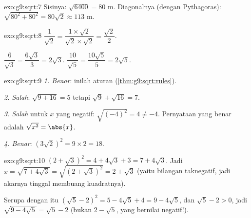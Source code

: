 \begin{solution}{exo:g9:sqrt:7}
Sisinya: $\sqrt{6400} = 80$ m. Diagonalnya (dengan Pythagoras):
$\sqrt{80^2 + 80^2} = 80\sqrt2 \approx 113$ m.
\end{solution}

\begin{solution}{exo:g9:sqrt:8}
$\dfrac{1}{\sqrt2} = \dfrac{1 \times \sqrt2}{\sqrt2 \times \sqrt2}
= \dfrac{\sqrt2}{2}$.

$\dfrac{6}{\sqrt3} = \dfrac{6\sqrt3}{3} = 2\sqrt3$.
\quad
$\dfrac{10}{\sqrt5} = \dfrac{10\sqrt5}{5} = 2\sqrt5$.
\end{solution}

\begin{solution}{exo:g9:sqrt:9}
\emph{1. Benar}: inilah aturan  (\cref{thm:g9:sqrt:rules}).

\emph{2. Salah}: $\sqrt{9 + 16} = 5$ tetapi $\sqrt9 + \sqrt{16} = 7$.

\emph{3. Salah} untuk $x$ yang negatif: $\sqrt{(-4)^2} = 4 \neq -4$.
Pernyataan yang benar adalah $\sqrt{x^2} = \abs{x}$.

\emph{4. Benar}: $\left(3\sqrt2\right)^2 = 9 \times 2 = 18$.
\end{solution}

\begin{solution}{exo:g9:sqrt:10}
$\left(2 + \sqrt3\right)^2 = 4 + 4\sqrt3 + 3 = 7 + 4\sqrt3$. Jadi
$x = \sqrt{7 + 4\sqrt3} = \sqrt{\left(2+\sqrt3\right)^2} = 2 + \sqrt3$
(yaitu bilangan taknegatif, jadi akarnya tinggal membuang kuadratnya).

Serupa dengan itu $\left(\sqrt5 - 2\right)^2 = 5 - 4\sqrt5 + 4 = 9 -
4\sqrt5$, dan $\sqrt5 - 2 > 0$, jadi
$\sqrt{9 - 4\sqrt5} = \sqrt5 - 2$ (bukan $2 - \sqrt5$, yang bernilai
negatif!).
\end{solution}

